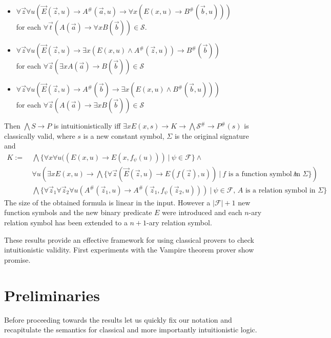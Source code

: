 \documentclass[a4paper,UKenglish,cleveref, autoref, thm-restate]{lipics-v2021}
\begin{document}
\begin{theorem}
\begin{itemize}
		\item $\forall \vec z\forall u(\vec E(\vec z, u)\to A^\#(\vec a, u)\to \forall x(E(x, u)\to B^\#(\vec b, u)))$\\for each $\forall \vec t(A(\vec a)\to \forall xB(\vec b))\in\mathcal S$.
		\item $\forall \vec z\forall u(\vec E(\vec z, u)\to \exists x(E(x, u)\wedge A^\#(\vec z, u))\to B^\#(\vec b))$\\for each $\forall \vec z(\exists xA(\vec a)\to B(\vec b))\in\mathcal S$
		\item $\forall \vec z\forall u(\vec E(\vec z, u)\to A^\#(\vec b)\to \exists x(E(x, u)\wedge B^\#(\vec b, u)))$\\for each $\forall \vec z(A(\vec a)\to \exists xB(\vec b))\in\mathcal S$
	\end{itemize}
	Then $\bigwedge S\to P$ is intuitionistically iff $\exists xE(x, s)\to K\to \bigwedge\mathcal S^\#\to P^\#(s)$ is classically valid, where $s$ is a new constant symbol, $\Sigma$ is the original signature and
	\begin{align*}
		K := &\:\bigwedge\{\forall x\forall u((E(x, u)\to E(x, f_\psi(u)))\:|\:\psi\in\mathcal F\}\wedge\\
		&\:\forall u\left(\exists xE(x, u)\to \bigwedge\{\forall\vec z(\vec E(\vec z, u)\to E(f(\vec z), u))\:|\:\text{$f$ is a function symbol in $\Sigma$}\}\right)\wedge\\
		&\:\bigwedge\{\forall\vec z_1\forall \vec z_2\forall u(A^\#(\vec z_1, u)\to A^\#(\vec z_1, f_\psi(\vec z_2, u)))\:|\:\text{$\psi\in\mathcal F$, $A$ is a relation symbol in $\Sigma$}\}
	\end{align*}
	The size of the obtained formula is linear in the input. However a $|\mathcal F| + 1$ new function symbols and the new binary predicate $E$ were introduced and each $n$-ary relation symbol has been extended to a $n+1$-ary relation symbol.
\end{theorem}

These results provide an effective framework for using classical provers to check intuitionistic validity. First experiments with the Vampire theorem prover show promise.


\section{Preliminaries}

Before proceeding towards the results let us quickly fix our notation and recapitulate the semantics for classical and more importantly intuitionistic logic.
\end{document}

